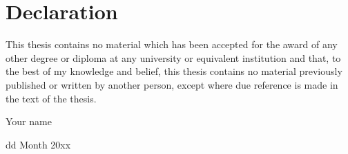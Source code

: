\section*{Declaration}

\vspace{1cm}

{
  This thesis contains no material which has been accepted for the
  award of any other degree or diploma at any university or equivalent
  institution and that, to the best of my knowledge and belief, this
  thesis contains no material previously published or written by
  another person, except where due reference is made in the text of
  the thesis.
}

\vspace{1cm}


\qquad Your name

\qquad dd Month 20xx


\clearpage
